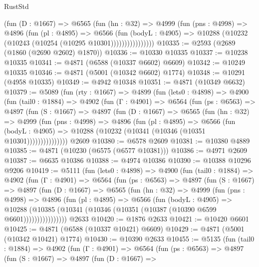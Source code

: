 \begin{lexlean}{RustStd}
\begin{coremodule}
{\begin{coremodule}
{{{{{{{{{{{{{{{{{{{{{{{{{{{{{                  (fun (D : @1667) =>
                  @6565
                    (fun (hn : @32) =>
                    @4999
                      (fun (pns : @4998) =>
                      @4896
                        (fun (pl : @4895) =>
                        @6566
                          (fun (bodyL : @4905) =>
                          @10288 (@10232 (@10243 (@10254 (@10295 @10301))))))))))))))))
@10335 := @2593 (@2689 (@1860 (@2690 @2602) @1870))
@10336 := @10330 @10335
@10337 := @10238 @10335
@10341 := @4871 (@6588 (@10337 @6602) @6609)
@10342 := @10249 @10335
@10346 := @4871 (@5001 (@10342 @6602) @1774)
@10348 := @10291 (@4958 @10335)
@10349 := @4942 @10348
@10351 := @4871 (@10349 @6632)
@10379 := @5089
    (fun (rty : @1667) =>
    @4899
      (fun (lets0 : @4898) =>
      @4900
        (fun (tail0 : @1884) =>
        @4902
          (fun (Γ : @4901) =>
          @6564
            (fun (ps : @6563) =>
            @4897
              (fun (S : @1667) =>
              @4897
                (fun (D : @1667) =>
                @6565
                  (fun (hn : @32) =>
                  @4999
                    (fun (pns : @4998) =>
                    @4896
                      (fun (pl : @4895) =>
                      @6566
                        (fun (bodyL : @4905) =>
                        @10288 (@10232 (@10341 (@10346 (@10351 @10301)))))))))))))))
    @2609
@10380 := @6578 @2609
@10381 := @10380 @4889
@10385 := @4871 (@10230 (@6575 (@6577 @10381)))
@10386 := @4971 @2609
@10387 := @6635 @10386
@10388 := @4974 @10386
@10390 := @10388 @10296 @9206
@10419 := @5111
    (fun (lets0 : @4898) =>
    @4900
      (fun (tail0 : @1884) =>
      @4902
        (fun (Γ : @4901) =>
        @6564
          (fun (ps : @6563) =>
          @4897
            (fun (S : @1667) =>
            @4897
              (fun (D : @1667) =>
              @6565
                (fun (hn : @32) =>
                @4999
                  (fun (pns : @4998) =>
                  @4896
                    (fun (pl : @4895) =>
                    @6566
                      (fun (bodyL : @4905) =>
                      @10288
                        (@10385 (@10341 (@10346 (@10351 (@10387 (@10390 @6599 @6601))))))))))))))))
    @2633
@10420 := @1876 @2633
@10421 := @10420 @6601
@10425 := @4871 (@6588 (@10337 @10421) @6609)
@10429 := @4871 (@5001 (@10342 @10421) @1774)
@10430 := @10390 @2633
@10455 := @5135
    (fun (tail0 : @1884) =>
    @4902
      (fun (Γ : @4901) =>
      @6564
        (fun (ps : @6563) =>
        @4897
          (fun (S : @1667) =>
          @4897
            (fun (D : @1667) =>
}}}}}}}}}}}}}}}}}}}}}}}}}}}}}
\end{coremodule}}
\end{coremodule}
\end{lexlean}

